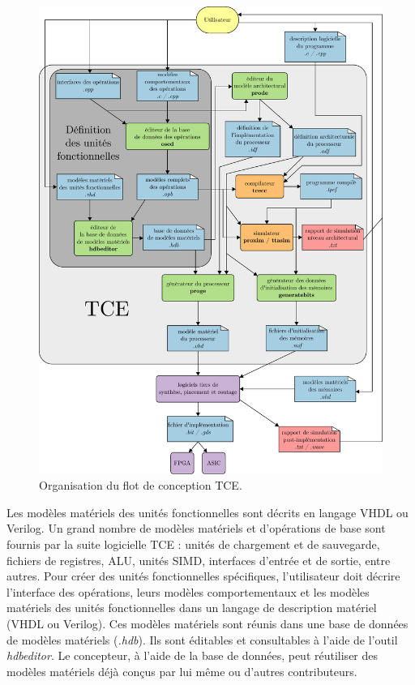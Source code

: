\begin{figure}[htp]
\centering
\includegraphics[width=\textwidth]{main/ch4_fig/tce}
\caption{Organisation du flot de conception TCE.}
\label{fig:tce}
\end{figure}
Les modèles matériels des unités fonctionnelles sont décrits en langage VHDL ou Verilog. Un grand nombre de modèles matériels et d'opérations de base sont fournis par la suite logicielle TCE : unités de chargement et de sauvegarde, fichiers de registres, ALU, unités SIMD, interfaces d'entrée et de sortie, entre autres. Pour créer des unités fonctionnelles spécifiques, l'utilisateur doit décrire l'interface des opérations, leurs modèles comportementaux et les modèles matériels des unités fonctionnelles dans un langage de description matériel (VHDL ou Verilog). Ces modèles matériels sont réunis dans une base de données de modèles matériels (\textit{.hdb}). Ils sont éditables et consultables à l'aide de l'outil \textit{hdbeditor}.
Le concepteur, à l'aide de la base de données, peut réutiliser des modèles matériels déjà conçus par lui même ou d'autres contributeurs.

